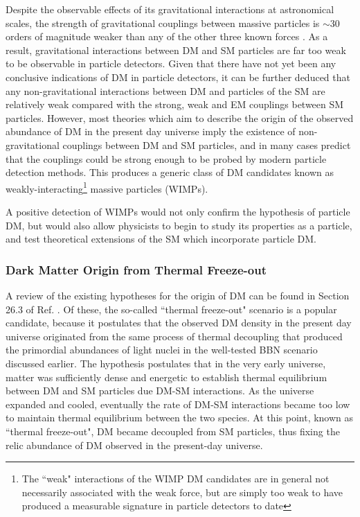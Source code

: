 Despite the observable effects of its gravitational interactions at astronomical scales, the strength of gravitational couplings between massive particles is \(\sim30\) orders of magnitude weaker than any of the other three known forces \cite{griffiths_2008}. As a result, gravitational interactions between DM and SM particles are far too weak to be observable in particle detectors. Given that there have not yet been any conclusive indications of DM in particle detectors, it can be further deduced that any non-gravitational interactions between DM and particles of the SM are relatively weak compared with the strong, weak and EM couplings between SM particles. However, most theories which aim to describe the origin of the observed abundance of DM in the present day universe imply the existence of non-gravitational couplings between DM and SM particles, and in many cases predict that the couplings could be strong enough to be probed by modern particle detection methods. This produces a generic class of DM candidates known as weakly-interacting\footnote{The ``weak" interactions of the WIMP DM candidates are in general not necessarily associated with the weak force, but are simply too weak to have produced a measurable signature in particle detectors to date} massive particles (WIMPs). 

A positive detection of WIMPs would not only confirm the hypothesis of particle DM, but would also allow physicists to begin to study its properties as a particle, and test theoretical extensions of the SM which incorporate particle DM.

\subsubsection{Dark Matter Origin from Thermal Freeze-out}

A review of the existing hypotheses for the origin of DM can be found in Section 26.3 of Ref. \cite{pdg_2018}. Of these, the so-called ``thermal freeze-out" scenario is a popular candidate, because it postulates that the observed DM density in the present day universe originated from the same process of thermal decoupling that produced the primordial abundances of light nuclei in the well-tested BBN scenario discussed earlier. The hypothesis postulates that in the very early universe, matter was sufficiently dense and energetic to establish thermal equilibrium between DM and SM particles due DM-SM interactions. As the universe expanded and cooled, eventually the rate of DM-SM interactions became too low to maintain thermal equilibrium between the two species. At this point, known as ``thermal freeze-out", DM became decoupled from SM particles, thus fixing the relic abundance of DM observed in the present-day universe. 

